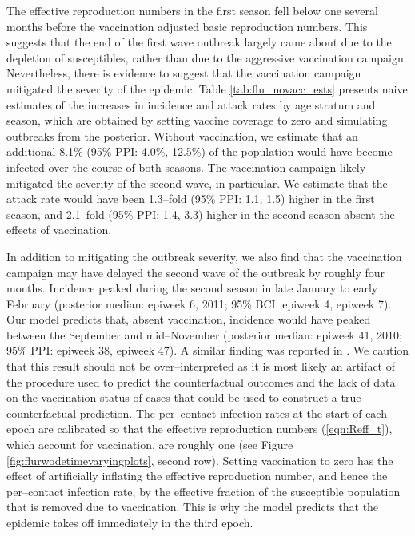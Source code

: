 The effective reproduction numbers in the first season fell below one several months before the vaccination adjusted basic reproduction numbers. This suggests that the end of the first wave outbreak largely came about due to the depletion of susceptibles, rather than due to the aggressive vaccination campaign. Nevertheless, there is evidence to suggest that the vaccination campaign mitigated the severity of the epidemic. Table \ref{tab:flu_novacc_ests} presents naive estimates of the increases in incidence and attack rates by age stratum and season, which are obtained by setting vaccine coverage to zero and simulating outbreaks from the posterior. Without vaccination, we estimate that an additional 8.1\% (95\% PPI: 4.0\%, 12.5\%) of the population would have become infected over the course of both seasons. The vaccination campaign likely mitigated the severity of the second wave, in particular. We estimate that the attack rate would have been 1.3--fold (95\% PPI: 1.1, 1.5) higher in the first season, and 2.1--fold (95\% PPI: 1.4, 3.3) higher in the second season absent the effects of vaccination. 

In addition to mitigating the outbreak severity, we also find that the vaccination campaign may have delayed the second wave of the outbreak by roughly four months. Incidence peaked during the second season in late January to early February (posterior median: epiweek 6, 2011; 95\% BCI: epiweek 4, epiweek 7). Our model predicts that, absent vaccination, incidence would have peaked between the September and mid--November (posterior median: epiweek 41, 2010; 95\% PPI: epiweek 38, epiweek 47). A similar finding was reported in \cite{shubin2016revealing}. We caution that this result should not be over--interpreted as it is most likely an artifact of the procedure used to predict the counterfactual outcomes and the lack of data on the vaccination status of cases that could be used to construct a true counterfactual prediction. The per--contact infection rates at the start of each epoch are calibrated so that the effective reproduction numbers (\ref{eqn:Reff_t}), which account for vaccination, are roughly one (see Figure \ref{fig:flurwodetimevaryingplots}, second row). Setting vaccination to zero has the effect of artificially inflating the effective reproduction number, and hence the per--contact infection rate, by the effective fraction of the susceptible population that is removed due to vaccination. This is why the model predicts that the epidemic takes off immediately in the third epoch.

